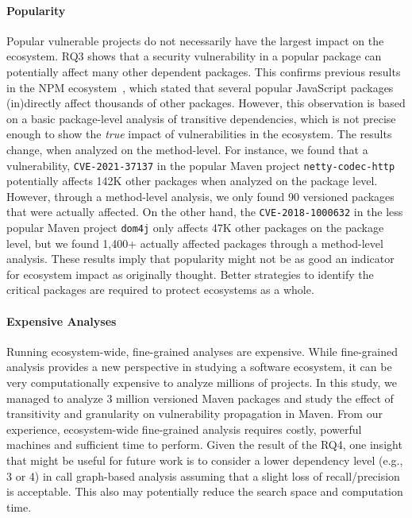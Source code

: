 \paragraph{Popularity}
Popular vulnerable projects do not necessarily have the largest impact on the ecosystem.
RQ3 shows that a security vulnerability in a popular package can potentially affect many other dependent packages.
This confirms previous results in the NPM ecosystem~\cite{zimmermann2019small}, which stated that several popular JavaScript packages (in)directly affect thousands of other packages.
However, this observation is based on a basic package-level analysis of transitive dependencies, which is not precise enough to show the \emph{true} impact of vulnerabilities in the ecosystem.
The results change, when analyzed on the method-level.
For instance, we found that a vulnerability, \texttt{CVE-2021-37137} in the popular Maven project \texttt{netty-codec-http} potentially affects 142K other packages when analyzed on the package level.
However, through a method-level analysis, we only found 90 versioned packages that were actually affected.
On the other hand, the {\tt CVE-2018-1000632} in the less popular Maven project {\tt dom4j} only affects 47K other packages on the package level, but we found 1,400+ actually affected packages through a method-level analysis.
These results imply that popularity might not be as good an indicator for ecosystem impact as originally thought.
Better strategies to identify the critical packages are required to protect ecosystems as a whole.

\paragraph{Expensive Analyses}
Running ecosystem-wide, fine-grained analyses are expensive.
While fine-grained analysis provides a new perspective in studying a software ecosystem, it can be very computationally expensive to analyze millions of projects.
In this study, we managed to analyze 3 million versioned Maven packages and study the effect of transitivity and granularity on vulnerability propagation in Maven. From our experience, ecosystem-wide fine-grained analysis requires costly, powerful machines and sufficient time to perform. Given the result of the RQ4, one insight that might be useful for future work is to consider a lower dependency level (e.g., 3 or 4) in call graph-based analysis assuming that a slight loss of recall/precision is acceptable. This also may potentially reduce the search space and computation time.

